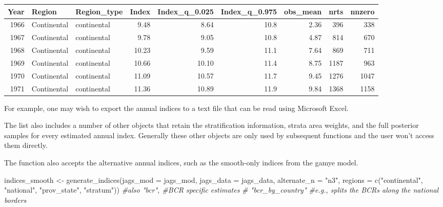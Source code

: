\documentclass[
]{book}
\newenvironment{Shaded}{\begin{snugshade}}{\end{snugshade}}
\newcommand{\AttributeTok}[1]{\textcolor[rgb]{0.77,0.63,0.00}{#1}}
\newcommand{\CommentTok}[1]{\textcolor[rgb]{0.56,0.35,0.01}{\textit{#1}}}
\newcommand{\FunctionTok}[1]{\textcolor[rgb]{0.00,0.00,0.00}{#1}}
\newcommand{\NormalTok}[1]{#1}
\newcommand{\OtherTok}[1]{\textcolor[rgb]{0.56,0.35,0.01}{#1}}
\newcommand{\SpecialCharTok}[1]{\textcolor[rgb]{0.00,0.00,0.00}{#1}}
\newcommand{\StringTok}[1]{\textcolor[rgb]{0.31,0.60,0.02}{#1}}
\begin{document}
\begin{tabular}{r|l|l|r|r|r|r|r|r}
\hline
Year & Region & Region\_type & Index & Index\_q\_0.025 & Index\_q\_0.975 & obs\_mean & nrts & nnzero\\
\hline
1966 & Continental & continental & 9.48 & 8.64 & 10.8 & 2.36 & 396 & 338\\
\hline
1967 & Continental & continental & 9.78 & 9.05 & 10.8 & 4.87 & 814 & 670\\
\hline
1968 & Continental & continental & 10.23 & 9.59 & 11.1 & 7.64 & 869 & 711\\
\hline
1969 & Continental & continental & 10.66 & 10.10 & 11.4 & 8.75 & 1187 & 963\\
\hline
1970 & Continental & continental & 11.09 & 10.57 & 11.7 & 9.45 & 1276 & 1047\\
\hline
1971 & Continental & continental & 11.36 & 10.89 & 11.9 & 9.84 & 1368 & 1158\\
\hline
\end{tabular}

For example, one may wish to export the annual indices to a text file that can be read using Microsoft Excel.

\begin{Shaded}
\end{Shaded}

The list also includes a number of other objects that retain the stratification information, strata area weights, and the full posterior samples for every estimated annual index. Generally these other objects are only used by subsequent functions and the user won't access them directly.

The function also accepts the alternative annual indices, such as the smooth-only indices from the gamye model.

\begin{Shaded}
\begin{Highlighting}[]
\NormalTok{indices\_smooth }\OtherTok{\textless{}{-}} \FunctionTok{generate\_indices}\NormalTok{(}\AttributeTok{jags\_mod =}\NormalTok{ jags\_mod,}
                            \AttributeTok{jags\_data =}\NormalTok{ jags\_data,}
                            \AttributeTok{alternate\_n =} \StringTok{"n3"}\NormalTok{,}
                            \AttributeTok{regions =} \FunctionTok{c}\NormalTok{(}\StringTok{"continental"}\NormalTok{,}
                            \StringTok{"national"}\NormalTok{,}
                            \StringTok{"prov\_state"}\NormalTok{,}
                            \StringTok{"stratum"}\NormalTok{))}
                            \CommentTok{\#also "bcr", \#BCR specific estimates}
                            \CommentTok{\# "bcr\_by\_country" \#e.g., splits the BCRs along the national borders}
\end{Highlighting}
\end{Shaded}
\end{document}
